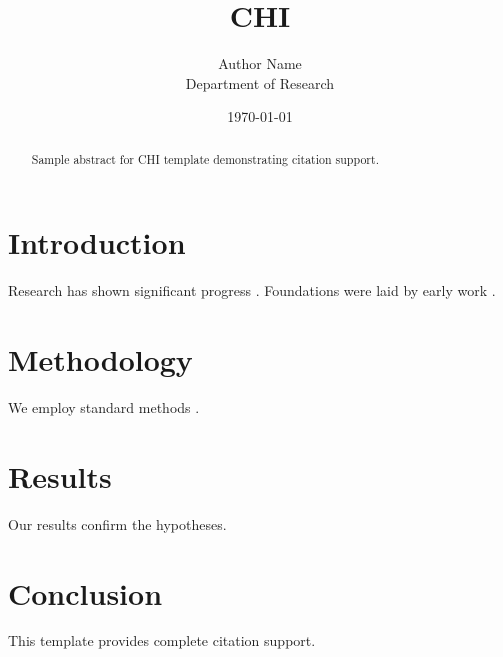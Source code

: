 \documentclass{article}
\title{CHI}
\author{Author Name \\ \small Department of Research}
\date{\today}
\begin{document}
\maketitle

\begin{abstract}
Sample abstract for CHI template demonstrating citation support.
\end{abstract}

\section{Introduction}
Research has shown significant progress \citep{einstein1905}. Foundations were laid by early work \citep{turing1950}.

\section{Methodology}
We employ standard methods \citep{knuth1984}.

\section{Results}
Our results confirm the hypotheses.

\section{Conclusion}
This template provides complete citation support.



\end{document}
